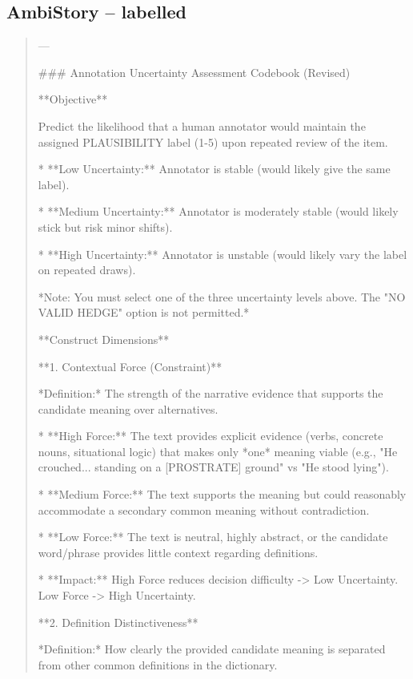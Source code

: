 \subsection*{AmbiStory -- labelled}
\begin{quote}\small
---

### Annotation Uncertainty Assessment Codebook (Revised)



**Objective**

Predict the likelihood that a human annotator would maintain the assigned PLAUSIBILITY label (1-5) upon repeated review of the item.

*   **Low Uncertainty:** Annotator is stable (would likely give the same label).

*   **Medium Uncertainty:** Annotator is moderately stable (would likely stick but risk minor shifts).

*   **High Uncertainty:** Annotator is unstable (would likely vary the label on repeated draws).



*Note: You must select one of the three uncertainty levels above. The "NO VALID HEDGE" option is not permitted.*



**Construct Dimensions**



**1. Contextual Force (Constraint)**

*Definition:* The strength of the narrative evidence that supports the candidate meaning over alternatives.

*   **High Force:** The text provides explicit evidence (verbs, concrete nouns, situational logic) that makes only *one* meaning viable (e.g., "He crouched... standing on a [PROSTRATE] ground" vs "He stood lying").

*   **Medium Force:** The text supports the meaning but could reasonably accommodate a secondary common meaning without contradiction.

*   **Low Force:** The text is neutral, highly abstract, or the candidate word/phrase provides little context regarding definitions.

*   **Impact:** High Force reduces decision difficulty -> Low Uncertainty. Low Force -> High Uncertainty.



**2. Definition Distinctiveness**

*Definition:* How clearly the provided candidate meaning is separated from other common definitions in the dictionary.


\end{quote}

